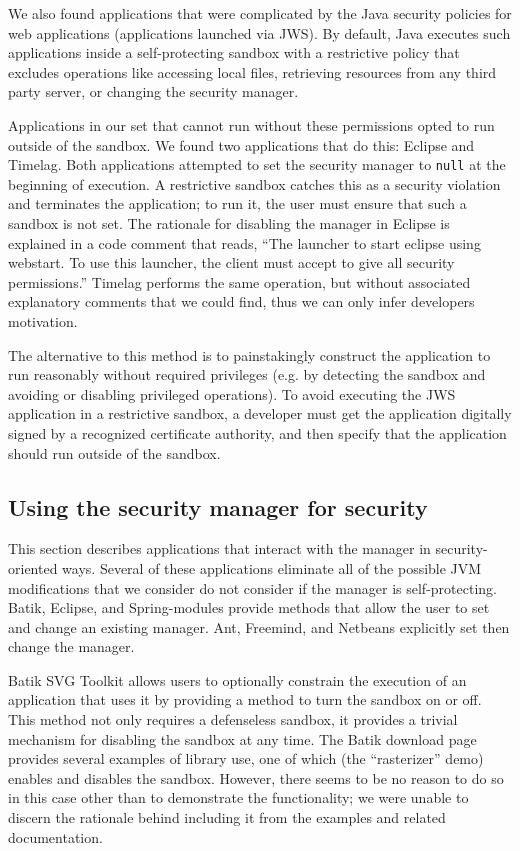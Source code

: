 \documentclass{sig-alternate}
\begin{document}
We also found applications that were complicated by the Java security policies
for web applications (applications launched via JWS). By default,
Java executes such applications inside a self-protecting 
sandbox with a restrictive policy that excludes
operations like accessing local files, retrieving resources
from any third party server, or changing the security manager. 

Applications in our set that cannot run without these permissions
opted to run outside of the sandbox.  
We found two applications that do this: Eclipse and
Timelag.  Both applications attempted
to set the security manager to \texttt{null} at the beginning of execution.
A restrictive sandbox catches this as a security violation and terminates the
application; to run it, the user must ensure that such a sandbox is not set.
The rationale for disabling the manager in Eclipse is explained in a 
code comment that reads, ``The launcher to start eclipse using webstart. To use
this launcher, the client must accept to give all security permissions.'' Timelag
performs the same operation, but without associated explanatory comments that we
could find, thus we can only 
infer developers motivation. 

The alternative to this method is to painstakingly
construct the application to run reasonably without required privileges (e.g. by
detecting the sandbox and avoiding or disabling privileged operations). To avoid executing
the JWS application in a restrictive 
sandbox, a developer must get the application digitally signed
by a recognized certificate authority, and then specify that the application should
run outside of the sandbox. 

\subsection{Using the security manager for security}
\label{sub:Using-the-Security}

This section describes applications that interact with the manager in
security-oriented ways.  Several of these applications eliminate all of the possible
JVM modifications that we consider do not consider if the manager is self-protecting.  Batik,
Eclipse, and Spring-modules provide 
methods that allow the user to set and change an existing manager. 
Ant, Freemind, and Netbeans explicitly set then change the manager.

Batik SVG Toolkit allows users to optionally constrain the execution of an application
that uses it by providing a method to turn the sandbox on or off. 
This method
not only requires a defenseless sandbox, it provides a trivial mechanism for
disabling the sandbox at any time. The Batik download page
provides several examples of library use, one of which (the
``rasterizer'' demo) enables and disables the sandbox.  However, there seems to
be no reason to do so in this case other than to demonstrate the functionality;
we were unable to discern the rationale behind including it from the examples
and related documentation.
\end{document}
